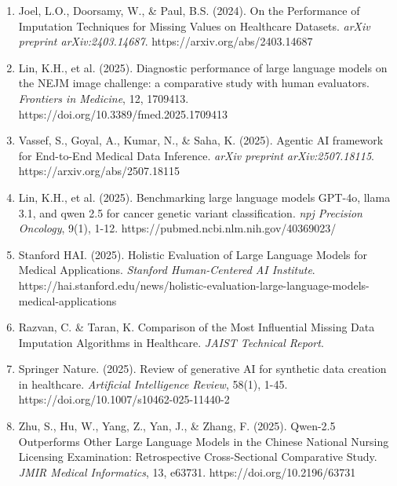 \documentclass[10pt,a4paper]{article}
\begin{document}
\begin{enumerate}
    \item Joel, L.O., Doorsamy, W., \& Paul, B.S. (2024). On the Performance of Imputation Techniques for Missing Values on Healthcare Datasets. \textit{arXiv preprint arXiv:2403.14687}. https://arxiv.org/abs/2403.14687
    
    \item Lin, K.H., et al. (2025). Diagnostic performance of large language models on the NEJM image challenge: a comparative study with human evaluators. \textit{Frontiers in Medicine}, 12, 1709413. https://doi.org/10.3389/fmed.2025.1709413
    
    \item Vassef, S., Goyal, A., Kumar, N., \& Saha, K. (2025). Agentic AI framework for End-to-End Medical Data Inference. \textit{arXiv preprint arXiv:2507.18115}. https://arxiv.org/abs/2507.18115
    
    \item Lin, K.H., et al. (2025). Benchmarking large language models GPT-4o, llama 3.1, and qwen 2.5 for cancer genetic variant classification. \textit{npj Precision Oncology}, 9(1), 1-12. https://pubmed.ncbi.nlm.nih.gov/40369023/
    
    \item Stanford HAI. (2025). Holistic Evaluation of Large Language Models for Medical Applications. \textit{Stanford Human-Centered AI Institute}. https://hai.stanford.edu/news/holistic-evaluation-large-language-models-medical-applications
    
    \item Razvan, C. \& Taran, K. Comparison of the Most Influential Missing Data Imputation Algorithms in Healthcare. \textit{JAIST Technical Report}. 
    
    \item Springer Nature. (2025). Review of generative AI for synthetic data creation in healthcare. \textit{Artificial Intelligence Review}, 58(1), 1-45. https://doi.org/10.1007/s10462-025-11440-2
    
    \item Zhu, S., Hu, W., Yang, Z., Yan, J., \& Zhang, F. (2025). Qwen-2.5 Outperforms Other Large Language Models in the Chinese National Nursing Licensing Examination: Retrospective Cross-Sectional Comparative Study. \textit{JMIR Medical Informatics}, 13, e63731. https://doi.org/10.2196/63731
\end{enumerate}

\newpage
\end{document}
